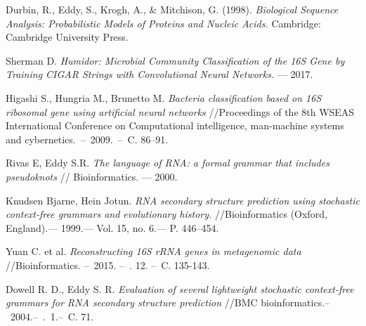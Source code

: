 \documentclass[12pt]{article}  %
\theoremstyle{definition}
\theoremstyle{remark}
\begin{document}
\begin{thebibliography}{9}



Durbin, R., Eddy, S., Krogh, A., \& Mitchison, G. (1998). \emph{Biological Sequence Analysis: Probabilistic Models of Proteins and Nucleic Acids.} Cambridge: Cambridge University Press.

Sherman D. \emph{Humidor: Microbial Community Classification of the
16S Gene by Training CIGAR Strings with Convolutional Neural
Networks.} –– 2017.

Higashi S., Hungria M., Brunetto M. 
\emph{Bacteria classification based on 16S ribosomal gene using artificial neural networks}
//Proceedings of the 8th WSEAS International Conference on Computational intelligence, man-machine systems and cybernetics.~--~2009.~--~C. 86--91.

Rivas E, Eddy S.R. \emph{The language of RNA: a formal grammar that includes pseudoknots} // Bioinformatics. –– 2000.


Knudsen Bjarne, Hein Jotun. 
\emph{RNA secondary structure prediction using stochastic context-free grammars and evolutionary history.} //Bioinformatics (Oxford, England).–– 1999.–– Vol. 15, no. 6.–– P. 446–454.

Yuan C. et al. \emph{Reconstructing 16S rRNA genes in metagenomic data} //Bioinformatics. --~2015. --~\textnumero. 12. --~C. 135-143.

Dowell R. D., Eddy S. R. 
\emph{Evaluation of several lightweight stochastic context-free grammars for RNA secondary structure prediction} //BMC bioinformatics.--~2004.--~\textnumero .~1.--~C. 71.

\end{thebibliography}
\end{document}
